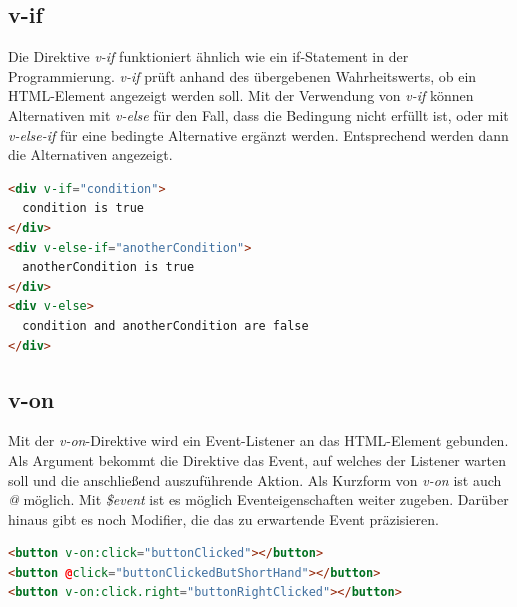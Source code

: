 \subsection*{v-if}
Die Direktive \emph{v-if} funktioniert ähnlich wie ein if-Statement in der Programmierung.
\emph{v-if} prüft anhand des übergebenen Wahrheitswerts, ob ein HTML-Element angezeigt werden soll.
Mit der Verwendung von \emph{v-if} können Alternativen mit \emph{v-else} für den Fall, dass die Bedingung nicht erfüllt ist,
oder mit \emph{v-else-if} für eine bedingte Alternative ergänzt werden.
Entsprechend werden dann die Alternativen angezeigt. \cite{vueDirectives}
\begin{lstlisting}[caption={\emph{v-if}-Direktive},language=html, label={lst:v-if}]
<div v-if="condition">
  condition is true
</div>
<div v-else-if="anotherCondition">
  anotherCondition is true
</div>
<div v-else>
  condition and anotherCondition are false
</div>
\end{lstlisting}

\subsection*{v-on}
Mit der \emph{v-on}-Direktive wird ein Event-Listener an das HTML-Element gebunden.
Als Argument bekommt die Direktive das Event, auf welches der Listener warten soll und
die anschließend auszuführende Aktion.
Als Kurzform von \emph{v-on} ist auch  \emph{@} möglich.
Mit \emph{\$event} ist es möglich Eventeigenschaften weiter zugeben.
Darüber hinaus gibt es noch Modifier, die das zu erwartende Event präzisieren. \cite{vueDirectives}
\begin{lstlisting}[caption={\emph{v-on}-Direktive},language=html, label={lst:v-on}]
<button v-on:click="buttonClicked"></button>
<button @click="buttonClickedButShortHand"></button>
<button v-on:click.right="buttonRightClicked"></button>
\end{lstlisting}


